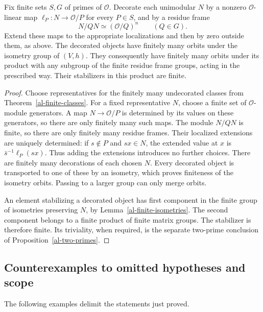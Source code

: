 \begin{corollary}
\label{al-finite-decorated}
Fix finite sets $S,G$ of primes of $\mathcal O$. Decorate each
unimodular $N$ by a nonzero $\mathcal O$-linear map
$\ell_P:N\to\mathcal O/P$ for every $P\in S$, and by a
residue frame
\[
           N/QN\simeq(\mathcal O/Q)^n\qquad(Q\in G).
\]
Extend these maps to the appropriate localizations and then
by zero outside them, as above. The decorated objects have
finitely many orbits under the isometry group of $(V,h)$.
They consequently have finitely many orbits under its product
with any subgroup of the finite residue frame groups, acting
in the prescribed way. Their stabilizers in this product are
finite.
\end{corollary}
\begin{proof}
Choose representatives for the finitely many undecorated
classes from Theorem~\ref{al-finite-classes}. For a fixed
representative $N$, choose a finite set of $\mathcal O$-module
generators. A map $N\to\mathcal O/P$ is determined by its
values on these generators, so there are only finitely many
such maps. The module $N/QN$ is finite, so there are only
finitely many residue frames. Their localized extensions are
uniquely determined: if $s\notin P$ and $sx\in N$, the
extended value at $x$ is $\bar s^{-1}\ell_P(sx)$.
Thus adding the extensions introduces no further choices.
There are finitely many decorations of each chosen $N$.
Every decorated object is transported to one of these by an
isometry, which proves finiteness of the isometry orbits.
Passing to a larger group can only merge orbits.

An element stabilizing a decorated object has first component
in the finite group of isometries preserving $N$, by
Lemma~\ref{al-finite-isometries}. The second component belongs
to a finite product of finite matrix groups. The stabilizer
is therefore finite. Its triviality, when required, is the
separate two-prime conclusion of Proposition~\ref{al-two-primes}.
\end{proof}

\subsection{Counterexamples to omitted hypotheses and scope}

The following examples delimit the statements just proved.


